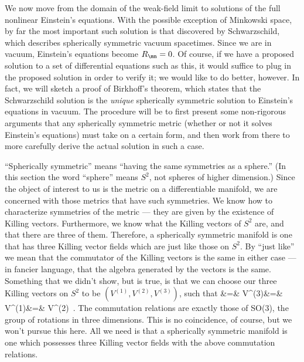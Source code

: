We now move from the domain of the weak-field limit to solutions of
the full nonlinear Einstein's equations.  With the possible exception
of Minkowski space, by far the most important such solution is that
discovered by Schwarzschild, which describes spherically symmetric
vacuum spacetimes.  Since we are in vacuum, Einstein's equations
become $R_\mn =0$.  Of course, if we have a proposed solution to
a set of differential equations such as this, it would suffice to
plug in the proposed solution in order to verify it; we would like
to do better, however.  In fact, we will sketch a proof of Birkhoff's
theorem, which states that the Schwarzschild solution is the {\it unique}
spherically symmetric solution to Einstein's equations in vacuum.
The procedure will be to first present some
non-rigorous arguments that any spherically symmetric metric (whether
or not it solves Einstein's equations) must take on a certain form,
and then work from there to more carefully derive the actual solution
in such a case.

``Spherically symmetric'' means ``having the same symmetries as a 
sphere.''  (In this section the word ``sphere'' means $S^2$, not
spheres of higher dimension.)
Since the object of interest to us is the metric on
a differentiable manifold, we are concerned with those metrics that
have such symmetries.  We know how to characterize symmetries of
the metric --- they are given by the existence of Killing vectors.
Furthermore, we know what the Killing vectors of $S^2$ are, and that 
there are three of them.  Therefore, a spherically symmetric manifold is 
one that has three Killing vector fields which are just like those
on $S^2$.  By ``just like'' we mean that the commutator of the
Killing vectors is the same in either case --- in fancier language,
that the algebra generated by the vectors is the same.  Something that
we didn't show, but is true, is that we can choose our three Killing
vectors on $S^2$ to be $(V^{(1)},V^{(2)},V^{(3)})$, such that
\bea
  [V^{(1)},V^{(2)}] &=&  V^{(3)}\cr
  [V^{(2)},V^{(3)}] &=&  V^{(1)}\cr [V^{(3)},V^{(1)}] &=&  V^{(2)}\ .
  \label{7.1}
\eea
The commutation relations are exactly those of SO(3), the group of 
rotations in three dimensions.  This is no coincidence, of course,
but we won't pursue this here.  All we need is that a spherically
symmetric manifold is one which possesses three Killing vector fields
with the above commutation relations.

